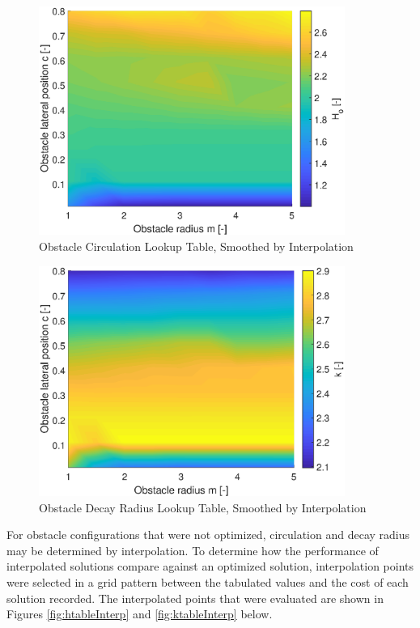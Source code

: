 \documentclass[numbered,pdftex]{ohio-etd}
\begin{document}
\begin{figure}[H]
	\centering
	\includegraphics[width=10cm]{PaperFigures/Methods/LookupTable/hTableHeat}
	\caption{Obstacle Circulation Lookup Table, Smoothed by Interpolation}
	\label{fig:htableheat}
\end{figure}

\begin{figure}[H]
	\centering
	\includegraphics[width=10cm]{PaperFigures/Methods/LookupTable/kTableHeat}
	\caption{Obstacle Decay Radius Lookup Table, Smoothed by Interpolation}
	\label{fig:ktable}
\end{figure}

For obstacle configurations that were not optimized, circulation and decay radius may be determined by interpolation. To determine how the performance of interpolated solutions compare against an optimized solution, interpolation points were selected in a grid pattern between the tabulated values and the cost of each solution recorded. The interpolated points that were evaluated are shown in Figures \ref{fig:htableInterp} and \ref{fig:ktableInterp} below. 
\end{document}
